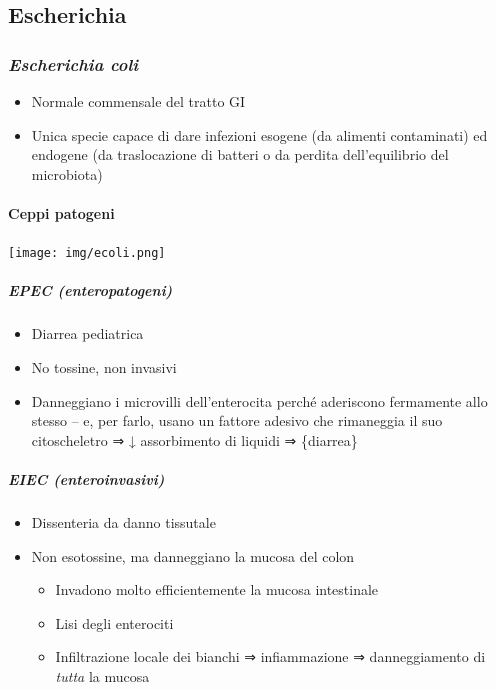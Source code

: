 \documentclass[italian,]{article}
\providecommand{\tightlist}{%
  \setlength{\itemsep}{0pt}\setlength{\parskip}{0pt}}
\renewcommand{\ss}[1]{\textsc{#1}}
\begin{document}
\hypertarget{escherichia}{%
\subsection{Escherichia}\label{escherichia}}

\hypertarget{escherichia-coli}{%
\subsubsection{\texorpdfstring{\emph{Escherichia
coli}}{Escherichia coli}}\label{escherichia-coli}}

\begin{itemize}
\tightlist
\item
  Normale commensale del tratto GI
\item
  Unica specie capace di dare infezioni esogene (da alimenti
  contaminati) ed endogene (da traslocazione di batteri o da perdita
  dell'equilibrio del microbiota)
\end{itemize}

\hypertarget{ceppi-patogeni}{%
\paragraph{Ceppi patogeni}\label{ceppi-patogeni}}

\texttt{[image: img/ecoli.png]}~

\hypertarget{epec-enteropatogeni}{%
\subparagraph{EPEC (enteropatogeni)}\label{epec-enteropatogeni}}

\begin{itemize}
\tightlist
\item
  Diarrea pediatrica
\item
  No tossine, non invasivi
\item
  Danneggiano i microvilli dell'enterocita perché aderiscono fermamente
  allo stesso -- e, per farlo, usano un fattore adesivo che rimaneggia
  il suo citoscheletro ⇒ ↓ assorbimento di liquidi ⇒ \ss\{diarrea\}
\end{itemize}

\hypertarget{eiec-enteroinvasivi}{%
\subparagraph{EIEC (enteroinvasivi)}\label{eiec-enteroinvasivi}}

\begin{itemize}
\tightlist
\item
  Dissenteria da danno tissutale
\item
  Non esotossine, ma danneggiano la mucosa del colon

  \begin{itemize}
  \tightlist
  \item
    Invadono molto efficientemente la mucosa intestinale
  \item
    Lisi degli enterociti
  \item
    Infiltrazione locale dei bianchi ⇒ infiammazione ⇒ danneggiamento di
    \emph{tutta} la mucosa
  \end{itemize}
\end{itemize}
\end{document}
